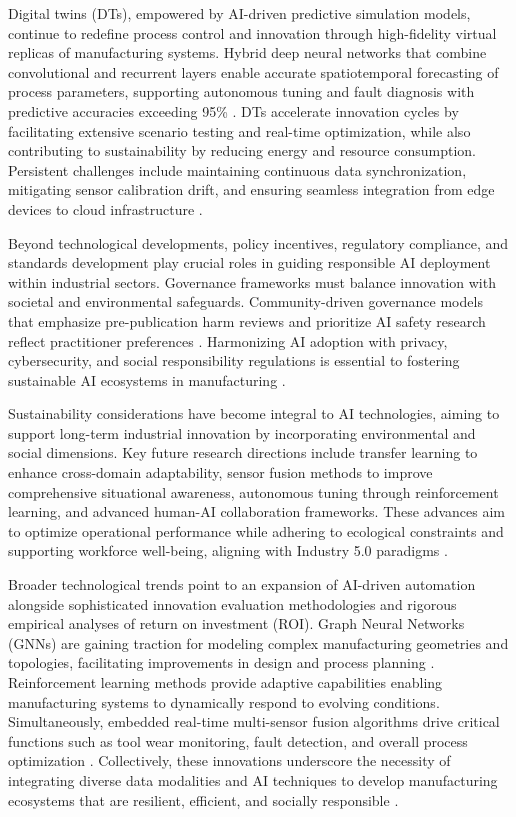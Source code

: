 \documentclass[sigconf]{acmart}
\begin{document}
Digital twins (DTs), empowered by AI-driven predictive simulation models, continue to redefine process control and innovation through high-fidelity virtual replicas of manufacturing systems. Hybrid deep neural networks that combine convolutional and recurrent layers enable accurate spatiotemporal forecasting of process parameters, supporting autonomous tuning and fault diagnosis with predictive accuracies exceeding 95\% \cite{ref26}. DTs accelerate innovation cycles by facilitating extensive scenario testing and real-time optimization, while also contributing to sustainability by reducing energy and resource consumption. Persistent challenges include maintaining continuous data synchronization, mitigating sensor calibration drift, and ensuring seamless integration from edge devices to cloud infrastructure \cite{ref26,ref38}.

Beyond technological developments, policy incentives, regulatory compliance, and standards development play crucial roles in guiding responsible AI deployment within industrial sectors. Governance frameworks must balance innovation with societal and environmental safeguards. Community-driven governance models that emphasize pre-publication harm reviews and prioritize AI safety research reflect practitioner preferences \cite{ref45}. Harmonizing AI adoption with privacy, cybersecurity, and social responsibility regulations is essential to fostering sustainable AI ecosystems in manufacturing \cite{ref44}.

Sustainability considerations have become integral to AI technologies, aiming to support long-term industrial innovation by incorporating environmental and social dimensions. Key future research directions include transfer learning to enhance cross-domain adaptability, sensor fusion methods to improve comprehensive situational awareness, autonomous tuning through reinforcement learning, and advanced human-AI collaboration frameworks. These advances aim to optimize operational performance while adhering to ecological constraints and supporting workforce well-being, aligning with Industry 5.0 paradigms \cite{ref5,ref7,ref44}.

Broader technological trends point to an expansion of AI-driven automation alongside sophisticated innovation evaluation methodologies and rigorous empirical analyses of return on investment (ROI). Graph Neural Networks (GNNs) are gaining traction for modeling complex manufacturing geometries and topologies, facilitating improvements in design and process planning \cite{ref31}. Reinforcement learning methods provide adaptive capabilities enabling manufacturing systems to dynamically respond to evolving conditions. Simultaneously, embedded real-time multi-sensor fusion algorithms drive critical functions such as tool wear monitoring, fault detection, and overall process optimization \cite{ref34,ref39}. Collectively, these innovations underscore the necessity of integrating diverse data modalities and AI techniques to develop manufacturing ecosystems that are resilient, efficient, and socially responsible \cite{ref9,ref33}.
\end{document}
